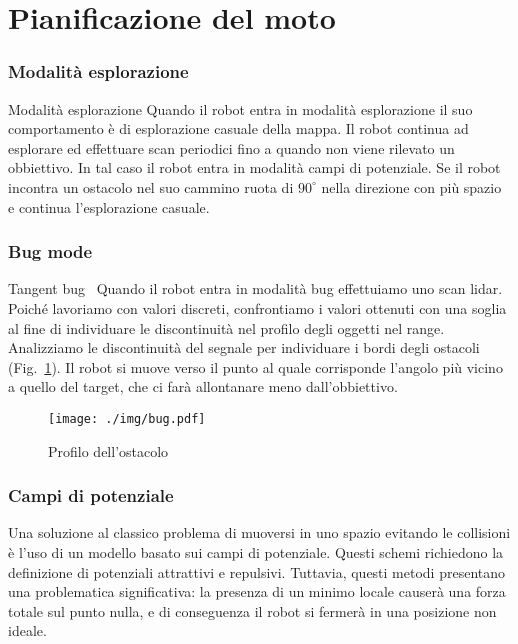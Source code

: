 \documentclass[10pt]{beamer}
\begin{document}
	\section{Pianificazione del moto}\label{sec:Pianificazione-del-moto}
	\frame{\sectionpage}
	
	\subsubsection{Modalità esplorazione}\label{subsec:Modalita-esplorazione}
	\begin{frame}{Modalità esplorazione}
		Quando il robot entra in modalità esplorazione il suo comportamento è
		di esplorazione casuale della mappa. Il robot continua ad esplorare ed
		effettuare scan periodici fino a quando non viene rilevato un
		obbiettivo.  In tal caso il robot entra in modalità campi di
		potenziale. Se il robot incontra un ostacolo nel suo cammino ruota di
		$90^{\circ}$ nella direzione con più spazio e continua l'esplorazione
		casuale.
	\end{frame}
	
	\subsubsection{Bug mode}\label{subsec:Bug-mode}
	\begin{frame}{Tangent bug~\cite{503814}}
		Quando il robot entra in modalità bug effettuiamo uno scan lidar.
		Poiché lavoriamo con valori discreti, confrontiamo i valori ottenuti
		con una soglia al fine di individuare le discontinuità nel profilo
		degli oggetti nel range. Analizziamo le discontinuità
		del segnale per individuare i bordi degli ostacoli
		(Fig.~\ref{fig:bug}). 
		Il robot si muove verso il punto al quale corrisponde l'angolo più
		vicino a quello del target, che ci farà allontanare meno
		dall'obbiettivo.
		
		\begin{figure}[H]
			\centering
			\texttt{[image: ./img/bug.pdf]}
			\caption{Profilo dell'ostacolo}
			\label{fig:bug}
		\end{figure}
	\end{frame}

	\subsubsection{Campi di potenziale}\label{subsec:Campi-di-potenziale}
	
	Una soluzione al classico problema di muoversi in uno spazio evitando le
	collisioni è l'uso di un modello basato sui campi di potenziale. Questi
	schemi richiedono la definizione di potenziali attrattivi e repulsivi.
	Tuttavia, questi metodi presentano una problematica significativa: la
	presenza di un minimo locale causerà una forza totale sul punto nulla, e di
	conseguenza il robot si fermerà in una posizione non ideale. 
\end{document}
